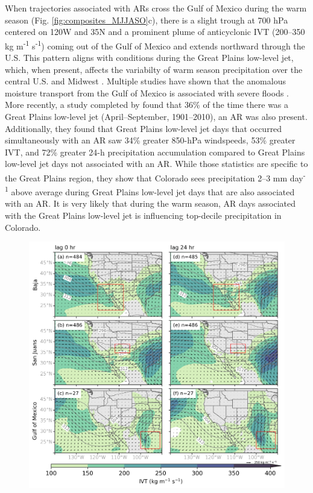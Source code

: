 \documentclass[draft]{agujournal2019}
\begin{document}
When trajectories associated with ARs cross the Gulf of Mexico during the warm season (Fig. \ref{fig:composites_MJJASO}c), there is a slight trough at 700 hPa centered on 120\textdegree W and 35\textdegree N and a prominent plume of anticyclonic IVT (200--350 kg m\textsuperscript{-1} s\textsuperscript{-1}) coming out of the Gulf of Mexico and extends northward through the U.S. This pattern aligns with conditions during the Great Plains low-level jet, which, when present, affects the variabilty of warm season precipitation over the central U.S. and Midwest \cite{Pu2016DynamicalPrecipitation, Helfand1995ClimatologyStates, Weaver2008VariabilityImpacts, Schubert1998SubseasonalStates}. Multiple studies have shown that the anomalous moisture transport from the Gulf of Mexico is associated with severe floods \cite{Mo1997AtmosphericStates, Weaver2009PentadBalance}. More recently, a study completed by  found that 36\% of the time there was a Great Plains low-level jet (April--September, 1901--2010), an AR was also present. Additionally, they found that Great Plains low-level jet days that occurred simultaneously with an AR saw 34\% greater 850-hPa windspeeds, 53\% greater IVT, and
72\% greater 24-h precipitation accumulation compared to Great Plains low-level jet days not associated with an AR. While those statistics are specific to the Great Plains region, they show that Colorado sees precipitation 2--3 mm day\textsuperscript{-1} above average during Great Plains low-level jet days that are also associated with an AR. It is very likely that during the warm season, AR days associated with the Great Plains low-level jet is influencing top-decile precipitation in Colorado. 

\begin{figure}
\noindent\includegraphics[width=\textwidth]{fig7.png}
\label{fig:composites_NDJFMA}
\caption{}
\end{figure}
\end{document}
